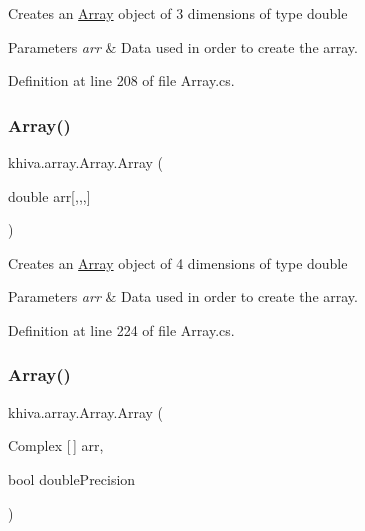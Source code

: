Creates an \mbox{\hyperlink{classkhiva_1_1array_1_1_array}{Array}} object of 3 dimensions of type double 


\begin{DoxyParams}{Parameters}
{\em arr} & Data used in order to create the array.\\
\hline
\end{DoxyParams}


Definition at line 208 of file Array.\+cs.

\mbox{\label{classkhiva_1_1array_1_1_array_a0b04615a046c8aacbfbf954c6e978188}} 
\subsubsection{\texorpdfstring{Array()}{Array()}\hspace{0.1cm}{\footnotesize\ttfamily [8/46]}}
{\footnotesize\ttfamily khiva.\+array.\+Array.\+Array (\begin{DoxyParamCaption}\item[{double}]{arr\mbox{[},,,\mbox{]} }\end{DoxyParamCaption})\hspace{0.3cm}{\ttfamily [inline]}}



Creates an \mbox{\hyperlink{classkhiva_1_1array_1_1_array}{Array}} object of 4 dimensions of type double 


\begin{DoxyParams}{Parameters}
{\em arr} & Data used in order to create the array.\\
\hline
\end{DoxyParams}


Definition at line 224 of file Array.\+cs.

\mbox{\label{classkhiva_1_1array_1_1_array_a20548767e46ad5aab5a2fb4cb9295250}} 
\subsubsection{\texorpdfstring{Array()}{Array()}\hspace{0.1cm}{\footnotesize\ttfamily [9/46]}}
{\footnotesize\ttfamily khiva.\+array.\+Array.\+Array (\begin{DoxyParamCaption}\item[{Complex \mbox{[}$\,$\mbox{]}}]{arr,  }\item[{bool}]{double\+Precision }\end{DoxyParamCaption})\hspace{0.3cm}{\ttfamily [inline]}}



